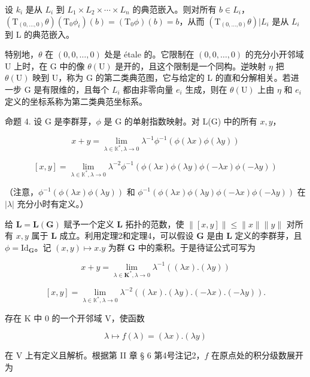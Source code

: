 设 \(k_{i}\) 是从 \(L_{i}\) 到 \(L_{1} \times L_{2} \times \cdots \times L_{n}\) 的典范嵌入。则对所有 \(b \in L_{i}\)，\((\mathrm{T}_{(0,\ldots,0)}\theta)(\mathrm{T}_{0}\phi_{i})(b) = (\mathrm{T}_{0}\phi)(b) = b\)，从而 \((\mathrm{T}_{(0,\ldots,0)}\theta)|L_{i}\) 是从 \(L_{i}\) 到 L 的典范嵌入。

特别地，\(\theta\) 在 \((0, 0, \ldots, 0)\) 处是 étale 的。它限制在 \((0,0,\ldots,0)\) 的充分小开邻域 U 上时，在 G 中的像 \(\theta(\mathrm{U})\) 是开的，且这个限制是一个同构。逆映射 \(\eta\) 把 \(\theta(\mathrm{U})\) 映到 U，称为 G 的第二类典范图，它与给定的 L 的直和分解相关。若进一步 G 是有限维的，且每个 \(L_{i}\) 都由非零向量 \(e_{i}\) 生成，则在 \(\theta(\mathrm{U})\) 上由 \(\eta\) 和 \(e_{i}\) 定义的坐标系称为第二类典范坐标系。

命题 4. 设 G 是李群芽，\(\phi\) 是 G 的单射指数映射。对 L(G) 中的所有 \(x, y\)，


\[
x + y = \lim _ {\lambda \in \mathbb {K} ^ {*}, \lambda \rightarrow 0} \lambda^ {- 1} \phi^ {- 1} (\phi (\lambda x) \phi (\lambda y))\tag{1}
\]

\[
[ x, y ] = \lim _ {\lambda \in \mathbb {K} ^ {*}, \lambda \rightarrow 0} \lambda^ {- 2} \phi^ {- 1} (\phi (\lambda x) \phi (\lambda y) \phi (- \lambda x) \phi (- \lambda y))\tag{2}
\]

（注意，\(\phi^{-1}(\phi(\lambda x)\phi(\lambda y))\) 和 \(\phi^{-1}(\phi(\lambda x)\phi(\lambda y)\phi(-\lambda x)\phi(-\lambda y))\) 在 \(|\lambda|\) 充分小时有定义。）

给 \(\mathbf{L} = \mathbf{L}(\mathbf{G})\) 赋予一个定义 \(\mathbf{L}\) 拓扑的范数，使 \(\| [x,y] \| \leqslant \| x \| \| y \|\) 对所有 \(x, y\) 属于 \(\mathbf{L}\) 成立。利用定理2和定理4，可以假设 \(\mathbf{G}\) 是由 \(\mathbf{L}\) 定义的李群芽，且 \(\phi = \mathrm{Id}_{\mathbf{G}}\)。记 \((x,y) \mapsto x.y\) 为群 \(\mathbf{G}\) 中的乘积。于是待证公式可写为


\[
x + y = \lim _ {\lambda \in \mathbf {K} ^ {*}, \lambda \rightarrow 0} \lambda^ {- 1} ((\lambda x). (\lambda y))\tag{3}
\]

\[
[ x, y ] = \lim _ {\lambda \in \mathbb {K} ^ {*}, \lambda \rightarrow 0} \lambda^ {- 2} ((\lambda x). (\lambda y). (- \lambda x). (- \lambda y)).\tag{4}
\]

存在 K 中 0 的一个开邻域 V，使函数

\[
\lambda \mapsto f (\lambda) = (\lambda x). (\lambda y)
\]

在 V 上有定义且解析。根据第 II 章 § 6 第4号注记2，\(f\) 在原点处的积分级数展开为

